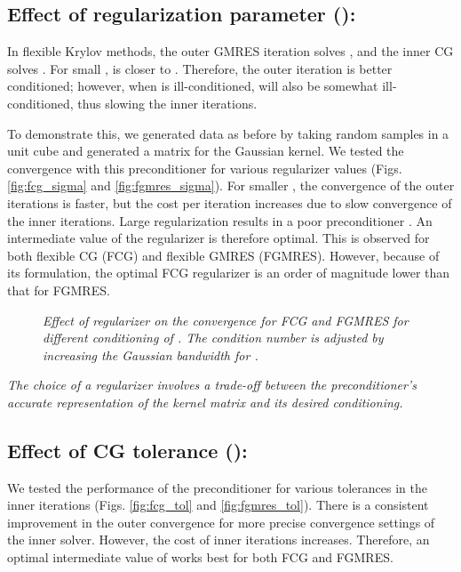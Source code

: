 \documentclass[10pt,journal,letterpaper,compsoc]{IEEEtran}
\begin{document}
\subsection{Effect of regularization parameter ():} In flexible Krylov methods, the outer GMRES iteration solves , and the inner CG solves . For small ,  is closer to . Therefore, the outer iteration is better conditioned; however, when  is ill-conditioned,  will also be somewhat ill-conditioned, thus slowing the inner iterations.

To demonstrate this, we generated data as before by taking  random samples in a unit cube and generated a matrix for the Gaussian kernel. We tested the convergence with this preconditioner for various regularizer values (Figs. \ref{fig:fcg_sigma} and \ref{fig:fgmres_sigma}). For smaller , the convergence of the outer iterations is faster, but the cost per iteration increases due to slow convergence of the inner iterations. Large regularization results in a poor preconditioner . An intermediate value of the regularizer is therefore optimal. This is observed for both flexible CG (FCG) and flexible GMRES (FGMRES). However, because of its formulation, the optimal FCG regularizer  is an order of magnitude lower than that for FGMRES.

\begin{figure}[p]
\centering
{}
\caption{\emph{Effect of regularizer  on the convergence for FCG and FGMRES for different conditioning of . The condition number is adjusted by increasing the Gaussian bandwidth  for .}}
\end{figure}

\emph{The choice of a regularizer involves a trade-off between the preconditioner's accurate representation of the kernel matrix and its desired conditioning.}

\subsection{Effect of CG tolerance ():} We tested the performance of the preconditioner for various tolerances in the inner iterations (Figs. \ref{fig:fcg_tol} and \ref{fig:fgmres_tol}). There is a consistent improvement in the outer convergence for more precise convergence settings of the inner solver. However, the cost of inner iterations increases. Therefore, an optimal intermediate value of  works best for both FCG and FGMRES.
\end{document}
